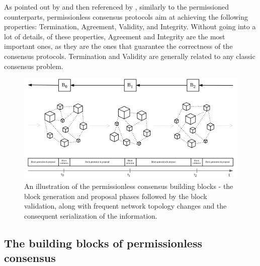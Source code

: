 \documentclass[journal]{IEEEtran}
\begin{document}
As pointed out by \cite{xiao2019distributed, 8629877} and then referenced by \cite{survey-dist-consensus}, 
similarly to the permissioned counterparts, permissionless consensus protocols 
aim at achieving the following properties: Termination, Agreement, Validity, 
and Integrity. Without going into a lot of details, of these properties, 
Agreement and Integrity are the most important ones, as they are the ones that
guarantee the correctness of the consensus protocols. Termination and Validity
are generally related to any classic consensus problem.

\begin{figure}[h]
  \centering
  \includegraphics[width=\columnwidth]{building-blocks-consensus.png}
  \caption{An illustration of the permissionless consensus building blocks - 
  the block generation and proposal phases followed by the block validation, 
  along with frequent network topology changes and the consequent serialization of the information.}
  \label{fig:building-blocks-consensus}
\end{figure}

\subsection{The building blocks of permissionless consensus}
\end{document}
